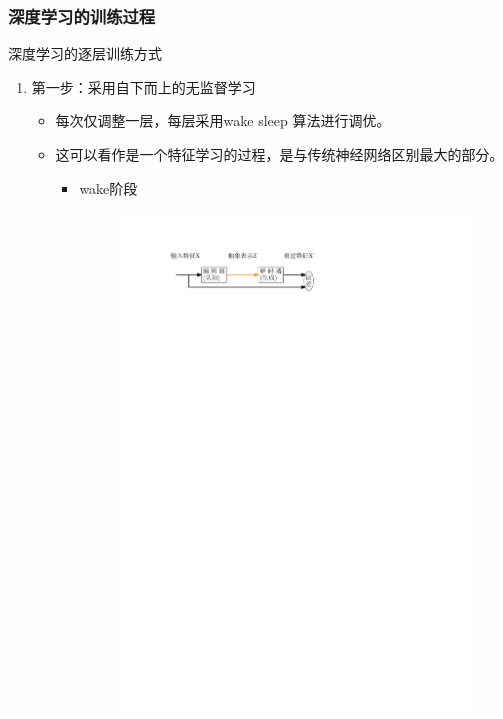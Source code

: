 \subsubsection{深度学习的训练过程}
\begin{note}
    深度学习的逐层训练方式
    \begin{enumerate}
        \item 第一步：采用自下而上的无监督学习
        \begin{itemize}
            \item 每次仅调整一层，每层采用wake sleep 算法进行调优。
            \item 这可以看作是一个特征学习的过程，是与传统神经网络区别最大的部分。
            \begin{itemize}
                \item wake阶段
                \begin{figure}[htbp]
                    \centering
                    \includegraphics{image/wake.pdf}
                \end{figure}


\end{itemize}
\end{itemize}
\end{enumerate}
\end{note}
